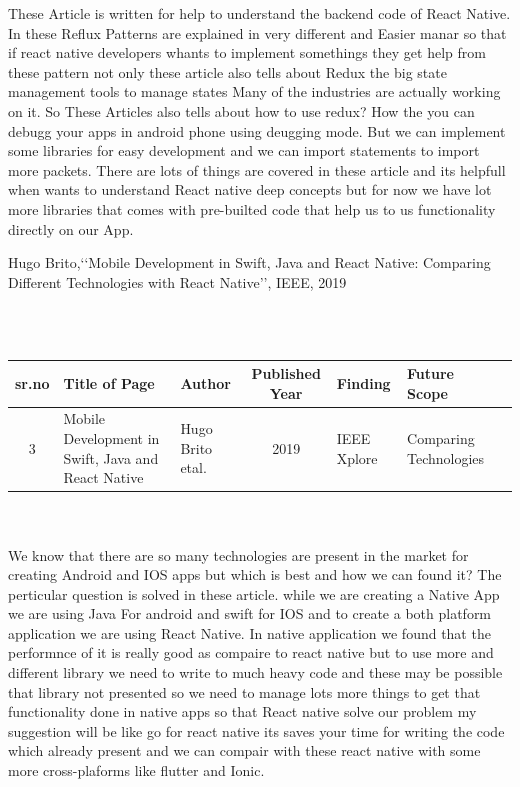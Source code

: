 \documentclass[12pt,a4paper]{report}
\begin{document}
\begin{enumerate}
 These Article is written for help to understand the backend code of React Native. In these Reflux Patterns are explained in very different and Easier manar so that if react native developers whants to implement somethings they get help from these pattern not only these article also tells about Redux the big state management tools to manage states Many of the industries are actually working on it.
So These Articles also tells about how to use redux? How the you can debugg your apps in android phone using deugging mode. But we can implement some libraries for easy development and we can import statements to import more packets. There are lots of things are covered in these article and its helpfull when wants to understand React native deep concepts but for now we have lot more libraries that comes with pre-builted code that help us to us functionality directly on our App. 


{\bf\item Hugo Brito,\lq\lq Mobile Development in Swift, Java and React Native: Comparing Different Technologies with React Native\rq\rq , IEEE, 2019}
\\
\\
\begin{tabular}{ |c | m{2.5cm} | m{2cm}| c | m{2cm} | m{2cm} | c | }

  \hline
  sr.no & Title of Page & Author & Published Year & Finding & Future Scope  \\ 
  \hline
  3 &  Mobile Development in Swift, Java and React Native & Hugo Brito etal. &  2019 & IEEE Xplore & Comparing Technologies \\
\hline 
  
\end{tabular}
\\
\\
 We know that there are so many technologies are present in the market for creating Android and IOS apps but which is best and how we can found it? The perticular question is solved in these article. while we are creating a Native App we are using Java For android and swift for IOS and to create a both platform application we are using React Native. In native application we found that the performnce of it is really good as compaire to react native but to use more and different library  we need to write to much heavy code and these may be possible that library not presented so we need to manage lots more things to get that functionality done in native apps so that React native solve our problem my suggestion will be like go for react native its saves your time for writing the code which already present and we can compair with these react native with some more cross-plaforms like flutter  and Ionic. 


\end{enumerate}
\end{document}
